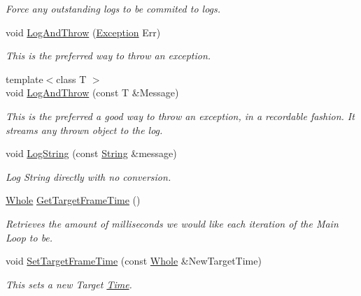 \begin{DoxyCompactItemize}
\begin{DoxyCompactList}\small\item\em Force any outstanding logs to be commited to logs. \item\end{DoxyCompactList}\item 
void \hyperlink{classphys_1_1World_a372ee96d395d735531f755fc0a72de4a}{LogAndThrow} (\hyperlink{classphys_1_1Exception}{Exception} Err)
\begin{DoxyCompactList}\small\item\em This is the preferred way to throw an exception. \item\end{DoxyCompactList}\item 
{\footnotesize template$<$class T $>$ }\\void \hyperlink{classphys_1_1World_a4bc9fb3942b6c1cf216bd356a1b6332b}{LogAndThrow} (const T \&Message)
\begin{DoxyCompactList}\small\item\em This is the preferred a good way to throw an exception, in a recordable fashion. It streams any thrown object to the log. \item\end{DoxyCompactList}\item 
void \hyperlink{classphys_1_1World_abf6cb15d85be4e7dcb99db24f979319b}{LogString} (const \hyperlink{namespacephys_aa03900411993de7fbfec4789bc1d392e}{String} \&message)
\begin{DoxyCompactList}\small\item\em Log String directly with no conversion. \item\end{DoxyCompactList}\item 
\hyperlink{namespacephys_a460f6bc24c8dd347b05e0366ae34f34a}{Whole} \hyperlink{classphys_1_1World_aa063ace52be484c7b03ec5859453f48b}{GetTargetFrameTime} ()
\begin{DoxyCompactList}\small\item\em Retrieves the amount of milliseconds we would like each iteration of the Main Loop to be. \item\end{DoxyCompactList}\item 
void \hyperlink{classphys_1_1World_ad95b5a5ad73e0a05826b5bd834876333}{SetTargetFrameTime} (const \hyperlink{namespacephys_a460f6bc24c8dd347b05e0366ae34f34a}{Whole} \&NewTargetTime)
\begin{DoxyCompactList}\small\item\em This sets a new Target \hyperlink{structphys_1_1Time}{Time}. \item\end{DoxyCompactList}\item 

\end{DoxyCompactItemize}
